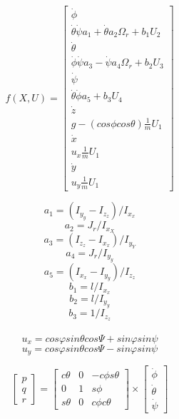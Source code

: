 \documentclass[12pt]{article}
\begin{document}
\[f(X, U) = \left[ \begin{array}{c}
                                    \dot{\phi} \\ 
                                    \dot{\theta}\dot{\psi}a_1 + \dot{\theta}a_2\Omega_r + b_1U_2 \\
                                    \dot{\theta} \\
                                    \dot{\phi}\dot{\psi}a_3 - \dot{\psi}a_4\Omega_r + b_2U_3 \\
                                    \dot{\psi} \\
                                    \dot{\theta}\dot{\phi}a_5 + b_3U_4 \\
                                    \dot{z} \\
                                    g - (cos\phi cos\theta)\frac{1}{m} U_1 \\
                                    \dot{x} \\
                                    u_x\frac{1}{m} U_1 \\
                                    \dot{y} \\
                                    u_y\frac{1}{m} U_1
            \end{array} \right] \]

\[ a_1 = (I_y_y - I_z_z)/I_x_x\]
\[ a_2 = J_r/I_x_X\]
\[ a_3 = (I_z_z - I_x_x)/I_y_Y \]
\[ a_4 = J_r/I_y_y \]
\[ a_5 = (I_x_x - I_y_y)/I_z_z \]
\[ b_1 = l/I_x_x \]
\[ b_2 = l/I_y_y \]
\[ b_3 = 1/I_z_z \]
\\
\[ u_x = cos\varphi sin\theta cos\Psi + sin\varphi sin\psi \]
\[ u_y = cos\varphi sin\theta cos\Psi - sin\varphi sin\psi \]

\[\left[ \begin{array}{c} p \\ q \\ r \end{array} \right] = \begin{bmatrix} c\theta & 0 & -c\phi s\theta \\ 0 & 1 & s\phi \\ s\theta & 0 & c\phi c\theta \end{bmatrix} \times \left[ \begin{array}{c} \dot{\phi} \\ \dot{\theta} \\ \dot{\psi} \end{array} \right]\] \\
\end{document}
